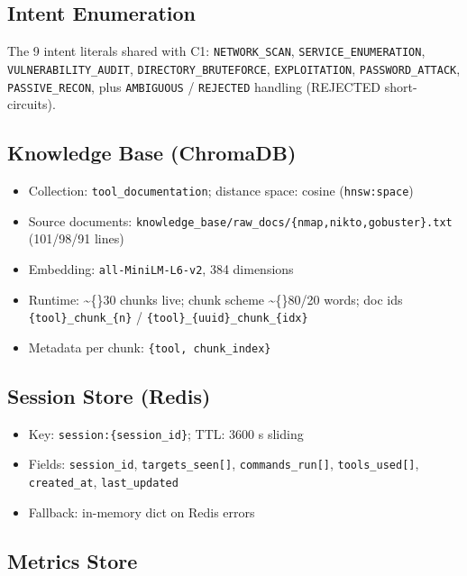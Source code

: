 \documentclass[10pt,journal,onecolumn]{IEEEtran}
\begin{document}
\subsection{Intent Enumeration}

The 9 intent literals shared with C1: \texttt{NETWORK\_SCAN}, \texttt{SERVICE\_ENUMERATION}, \texttt{VULNERABILITY\_AUDIT}, \texttt{DIRECTORY\_BRUTEFORCE}, \texttt{EXPLOITATION}, \texttt{PASSWORD\_ATTACK}, \texttt{PASSIVE\_RECON}, plus \texttt{AMBIGUOUS} / \texttt{REJECTED} handling (REJECTED short-circuits).

\subsection{Knowledge Base (ChromaDB)}

\begin{itemize}
\item Collection: \texttt{tool\_documentation}; distance space: cosine (\texttt{hnsw:space})
\item Source documents: \texttt{knowledge\_\allowbreak base/\allowbreak raw\_\allowbreak docs/\allowbreak \{nmap,nikto,gobuster\}.\allowbreak txt} (101/98/91 lines)
\item Embedding: \texttt{all-MiniLM-L6-v2}, 384 dimensions
\item Runtime: \textasciitilde\{\}30 chunks live; chunk scheme \textasciitilde\{\}80/20 words; doc ids \texttt{\{tool\}\_chunk\_\{n\}} / \texttt{\{tool\}\_\allowbreak \{uuid\}\_\allowbreak chunk\_\allowbreak \{idx\}}
\item Metadata per chunk: \texttt{\{tool, chunk\_index\}}
\end{itemize}

\subsection{Session Store (Redis)}

\begin{itemize}
\item Key: \texttt{session:\{session\_id\}}; TTL: 3600 s sliding
\item Fields: \texttt{session\_id}, \texttt{targets\_seen[]}, \texttt{commands\_run[]}, \texttt{tools\_used[]}, \texttt{created\_at}, \texttt{last\_updated}
\item Fallback: in-memory dict on Redis errors
\end{itemize}

\subsection{Metrics Store}
\end{document}
